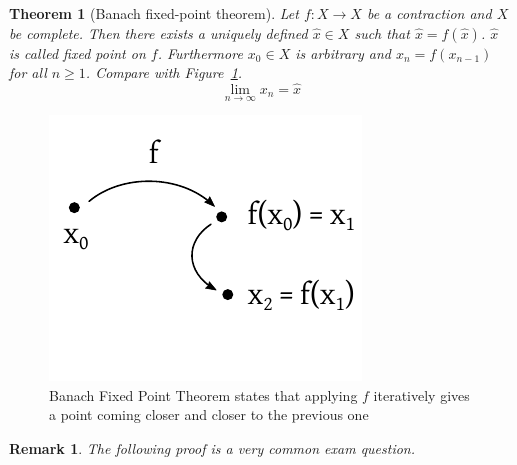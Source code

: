 \documentclass{article}
\newtheorem{theorem}{Theorem}  \numberwithin{theorem}{section}
\newtheorem{remark}{Remark}  \numberwithin{remark}{section}
\begin{document}
\begin{theorem}[Banach fixed-point theorem] %
  Let $f: X \to X$ be a contraction and $X$ be complete.
  Then there exists a uniquely defined $\hat{x} \in X$ such that $\hat{x} = f(\hat{x})$. $\hat{x}$ is called fixed point on $f$.
  Furthermore $x_0 \in X$ is arbitrary and $x_n = f(x_{n-1})$ for all $n \geq 1$. Compare with Figure~\ref{img:banachfixed}.
  \[ \lim_{n \to \infty} x_n = \hat{x} \]
\end{theorem}

\begin{figure}[t]
  \begin{center}
    \includegraphics{img/07b_banach_fixed_point_theorem.pdf}
    \caption{Banach Fixed Point Theorem states that applying $f$ iteratively gives a point coming closer and closer to the previous one}
    \label{img:banachfixed}
  \end{center}
\end{figure}

\begin{remark}
  The following proof is a very common exam question.
\end{remark}
\end{document}
